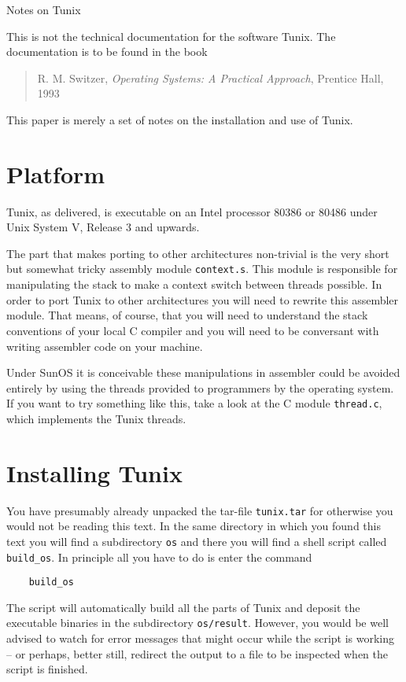 
\pagestyle{empty}
\parindent0mm   
\textwidth16cm  
\newcommand{\aaa}{\vspace{2.5ex plus0.3ex minus0.3ex}}


\begin{center}
{\huge Notes on Tunix}
\end{center}

This is not the technical documentation for the
software Tunix. The documentation is to be found
in the book
\begin{quote}
R. M. Switzer, {\it Operating Systems: A Practical
Approach}, Prentice Hall, 1993
\end{quote}
This paper is merely a set of notes on the installation
and use of Tunix.

\section{Platform}
\noindent

Tunix, as delivered, is executable on an Intel processor
80386 or 80486 under Unix System V, Release 3 and
upwards.


The part that makes porting to other
architectures non-trivial is the very short but
somewhat tricky assembly module {\tt context.s}.
This module is responsible for manipulating the
stack to make a context switch between threads
possible. In order to port Tunix to other architectures
you will need to rewrite this assembler module. That
means, of course, that you will need to understand
the stack conventions of your local C compiler and you
will need to be conversant with writing assembler
code on your machine.


Under SunOS it is conceivable these manipulations in
assembler could be avoided entirely by using the
threads provided to programmers by the operating
system. If you want to try something like this,
take a look at the C module {\tt thread.c}, which
implements the Tunix threads.


\section{Installing Tunix}
\noindent

You have presumably already unpacked the tar-file
{\tt tunix.tar} for otherwise you would not be reading
this text. In the same directory in which you found
this text you will find a subdirectory {\tt os} and there
you will find a shell script  called
{\tt build\_os}. In principle all you have to do is
enter the command
\begin{verbatim}
    build_os
\end{verbatim}
The script will automatically build all the parts
of Tunix and deposit the executable binaries in
the subdirectory {\tt os/result}. However, you
would be well advised to watch for error messages
that might occur while the script is working --
or perhaps, better still, redirect the output to
a file to be inspected when the script is finished.


